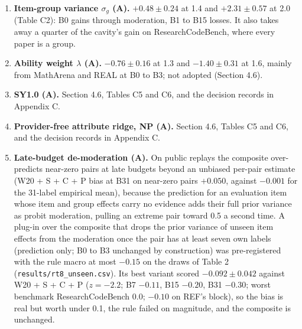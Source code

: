 \documentclass[
]{article}
\begin{document}
\begin{enumerate}
  decisive replay (Table C4) \(\sigma_i = 2\) gains at B0 through extra
  moderation (\(-8.9\)) and loses \(+2.0\) to \(+3.5\) at each budget
  from B3 to B31 (\(+1.15 \pm 0.70\) overall, REAL \(+5.1\)). Plug-in
  MAP item offsets with SD 2 tie the cavity in ALC (\(-0.54 \pm 0.24\)
  against \(-0.52 \pm 0.13\) at \(\sigma_x = 2.0\), REAL \(-0.19\)) but
  shift the logit by \(+1.3\) to \(+1.4\) after a partner's success
  against \(+0.7\) to \(+1.0\) exact; an early 10-pair check had shown
  them losing on REAL (\(+0.75 \pm 0.77\)).
\item
  \textbf{Item-group variance \(\sigma_g\) (A).} \(+0.48 \pm 0.24\) at
  1.4 and \(+2.31 \pm 0.57\) at 2.0 (Table C2): B0 gains through
  moderation, B1 to B15 losses. It also takes away a quarter of the
  cavity's gain on ResearchCodeBench, where every paper is a group.
\item
  \textbf{Ability weight \(\lambda\) (A).} \(-0.76 \pm 0.16\) at 1.3 and
  \(-1.40 \pm 0.31\) at 1.6, mainly from MathArena and REAL at B0 to B3;
  not adopted (Section 4.6).
\item
  \textbf{SY1.0 (A).} Section 4.6, Tables C5 and C6, and the decision
  records in Appendix C.
\item
  \textbf{Provider-free attribute ridge, NP (A).} Section 4.6, Tables C5
  and C6, and the decision records in Appendix C.
\item
  \textbf{Late-budget de-moderation (A).} On public replays the
  composite over-predicts near-zero pairs at late budgets beyond an
  unbiased per-pair estimate (W20 + S + C + P bias at B31 on near-zero
  pairs \(+0.050\), against \(-0.001\) for the 31-label empirical mean),
  because the prediction for an evaluation item whose item and group
  effects carry no evidence adds their full prior variance as probit
  moderation, pulling an extreme pair toward 0.5 a second time. A
  plug-in over the composite that drops the prior variance of unseen
  item effects from the moderation once the pair has at least seven own
  labels (prediction only; B0 to B3 unchanged by construction) was
  pre-registered with the rule macro at most \(-0.15\) on the draws of
  Table 2 (\texttt{results/rt8\_unseen.csv}). Its best variant scored
  \(-0.092 \pm 0.042\) against W20 + S + C + P (\(z = -2.2\); B7
  \(-0.11\), B15 \(-0.20\), B31 \(-0.30\); worst benchmark
  ResearchCodeBench \(0.0\); \(-0.10\) on REF's block), so the bias is
  real but worth under 0.1, the rule failed on magnitude, and the
  composite is unchanged.
\end{enumerate}
\end{document}

